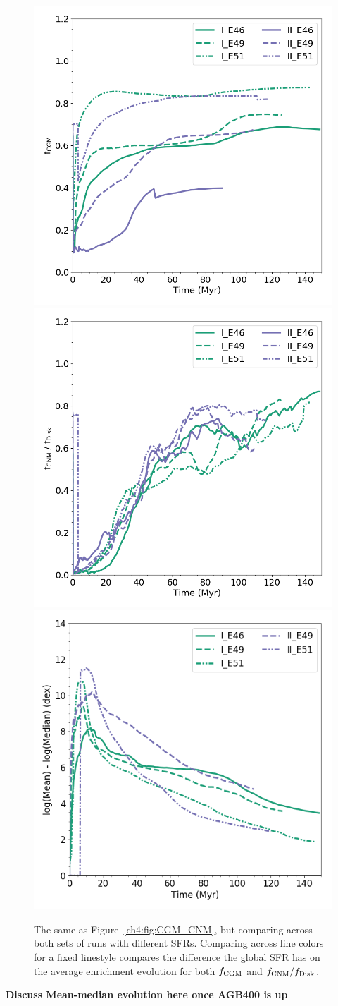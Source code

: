 \begin{figure}
  \centering
  \includegraphics[width=0.45\linewidth]{figures/ch4/combined_CGM_average_evolution}
  \includegraphics[width=0.45\linewidth]{figures/ch4/combined_CNM_average_evolution}\\
  \includegraphics[width=0.45\linewidth]{figures/ch4/combined_CNM_average_mean-median}
  \caption{The same as Figure~\ref{ch4:fig:CGM_CNM}, but comparing across both sets of runs with different SFRs. Comparing across line colors for a fixed linestyle compares the difference the global SFR has on the average enrichment evolution for both $f_{\rm CGM}$ and $f_{\rm CNM} / f_{\rm Disk}$.}
  \label{ch4:fig:SFR_comparison_CGM_CNM}
\end{figure}

\textbf{Discuss Mean-median evolution here once AGB400 is up}

